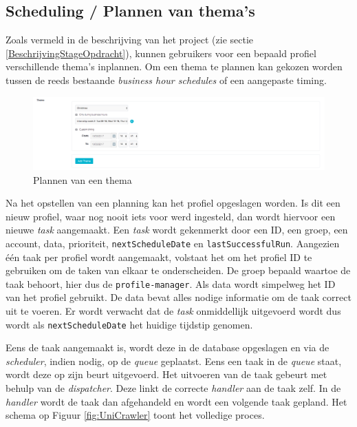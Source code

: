 \subsection{Scheduling / Plannen van thema's}
Zoals vermeld in de beschrijving van het project (zie sectie \ref{BeschrijvingStageOpdracht}), kunnen gebruikers voor een bepaald profiel verschillende thema's inplannen. Om een thema te plannen kan gekozen worden tussen de reeds bestaande \textit{business hour schedules} of een aangepaste timing. 

\begin{figure}[H]
	\centering
	\includegraphics[width=1\textwidth]{Figuren/ThemeSet.png}
	\caption{Plannen van een thema}
	\label{fig:ThemeSet}
\end{figure}
Na het opstellen van een planning kan het profiel opgeslagen worden. Is dit een nieuw profiel, waar nog nooit iets voor werd ingesteld, dan wordt hiervoor een nieuwe \textit{task} aangemaakt. Een \textit{task} wordt gekenmerkt door een ID, een groep, een account, data, prioriteit, \texttt{nextScheduleDate} en \texttt{lastSuccessfulRun}. Aangezien \'{e}\'{e}n taak per profiel wordt aangemaakt, volstaat het om het profiel ID te gebruiken om de taken van elkaar te onderscheiden. De groep bepaald waartoe de taak behoort, hier dus de \texttt{profile-manager}. Als data wordt simpelweg het ID van het profiel gebruikt. De data bevat alles nodige informatie om de taak correct uit te voeren. Er wordt verwacht dat de \textit{task} onmiddellijk uitgevoerd wordt dus wordt als \texttt{nextScheduleDate} het huidige tijdstip genomen. 

Eens de taak aangemaakt is, wordt deze in de database opgeslagen en via de \textit{scheduler}, indien nodig, op de \textit{queue} geplaatst. Eens een taak in de \textit{queue} staat, wordt deze op zijn beurt uitgevoerd. Het uitvoeren van de taak gebeurt met behulp van de \textit{dispatcher}. Deze linkt de correcte \textit{handler} aan de taak zelf. In de \textit{handler} wordt de taak dan afgehandeld en wordt een volgende taak gepland. Het schema op Figuur \ref{fig:UniCrawler} toont het volledige proces. 

